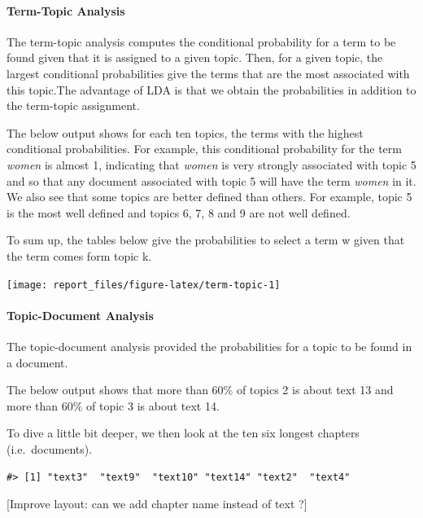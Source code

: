 \documentclass[
]{article}
\begin{document}
\hypertarget{term-topic-analysis}{%
\paragraph{Term-Topic Analysis}\label{term-topic-analysis}}

The term-topic analysis computes the conditional probability for a term
to be found given that it is assigned to a given topic. Then, for a
given topic, the largest conditional probabilities give the terms that
are the most associated with this topic.The advantage of LDA is that we
obtain the probabilities in addition to the term-topic assignment.

The below output shows for each ten topics, the terms with the highest
conditional probabilities. For example, this conditional probability for
the term \emph{women} is almost 1, indicating that \emph{women} is very
strongly associated with topic 5 and so that any document associated
with topic 5 will have the term \emph{women} in it. We also see that
some topics are better defined than others. For example, topic 5 is the
most well defined and topics 6, 7, 8 and 9 are not well defined.

To sum up, the tables below give the probabilities to select a term w
given that the term comes form topic k.

\begin{center}\texttt{[image: report\_files/figure-latex/term-topic-1]} \end{center}

\hypertarget{topic-document-analysis}{%
\paragraph{Topic-Document Analysis}\label{topic-document-analysis}}

The topic-document analysis provided the probabilities for a topic to be
found in a document.

The below output shows that more than 60\% of topics 2 is about text 13
and more than 60\% of topic 3 is about text 14.

To dive a little bit deeper, we then look at the ten six longest
chapters (i.e.~documents).

\begin{verbatim}
#> [1] "text3"  "text9"  "text10" "text14" "text2"  "text4"
\end{verbatim}

{[}Improve layout: can we add chapter name instead of text ?{]}
\end{document}
